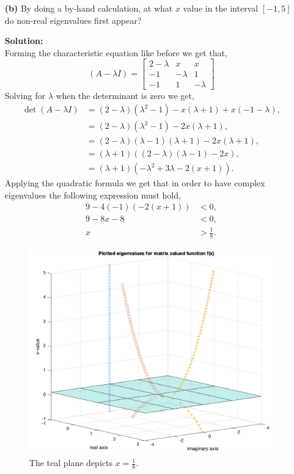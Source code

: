 \documentclass[12pt]{article}
\makeatletter
\theoremstyle{homework}
\newenvironment{exercise}[1]
{\def\@currentlabel{#1}\exercisecore}
{\endexercisecore}
\newcommand{\localhead}[1]{\par\smallskip\noindent\textbf{#1}\nobreak\\}%
\newcommand\solution{\localhead{Solution:}}
\makeatother
\begin{document}
\begin{exercise}{Problem P23}
\begin{enumerate}
\item[\textbf{(b)}] By doing a by-hand calculation, at what $x$ value in the interval $[-1, 5]$
do non-real eigenvalues first appear? 
\solution 
Forming the characteristic equation like before we get that, 
  \begin{equation*}
   (A - \lambda I) =  \begin{bmatrix}
      2 - \lambda & x & x\\
      -1& -\lambda & 1\\
      -1 & 1 & -\lambda
    \end{bmatrix}
  \end{equation*}
  Solving for $\lambda$ when the determinant is zero we get, 
  \begin{align*}
    \det(A - \lambda I) &= (2 - \lambda)(\lambda^2 - 1) - x(\lambda + 1) + x(-1 - \lambda),\\ 
    &= (2 - \lambda)(\lambda^2 - 1) - 2x(\lambda + 1),\\ 
    &= (2 - \lambda)(\lambda - 1)(\lambda + 1) - 2x(\lambda + 1),\\
    &= (\lambda + 1)((2 - \lambda)(\lambda - 1) - 2x),\\
    &= (\lambda + 1)(-\lambda^2 + 3\lambda - 2(x + 1)).
  \end{align*}
  Applying the quadratic formula we get that in order to have complex eigenvalues the following expression must hold, 
  \begin{align*}
    9 - 4(-1)(-2(x + 1)) &< 0,\\
    9 - 8x - 8 &<0,\\
    x &> \frac{1}{8}. 
  \end{align*}

  \begin{figure}[H]
    \begin{center}
      \caption{The teal plane depicts $x = \frac{1}{8}$.}
      \includegraphics[width=\textwidth]{fig2.png}
    \end{center}
  \end{figure}
\end{enumerate}  
\end{exercise}
\end{document}
